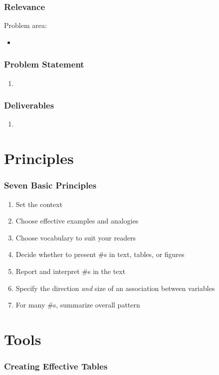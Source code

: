 \documentclass[compress,handout,10pt]{beamer}
\let\olditem\item
\renewcommand{\item}{\setlength{\itemsep}{0.5\baselineskip}\olditem}
\begin{document}
\begin{frame}
    \frametitle{Relevance}
    Problem area:
    \vspace{7pt}
             \begin{itemize}
                 \item 
             \end{itemize}
\end{frame}

\begin{frame}
    \frametitle{Problem Statement}
    \begin{enumerate}
        \item
    \end{enumerate}
\end{frame}

\begin{frame}
    \frametitle{Deliverables}
    \begin{enumerate}
        \item
    \end{enumerate}
\end{frame}

\section{Principles}
\begin{frame}
    \frametitle{Seven Basic Principles}
     \begin{enumerate}
         \item Set the context 
         \item Choose effective examples and analogies
         \item Choose vocabulary to suit your readers
         \item Decide whether to present \#s in text, tables, or figures
         \item Report and interpret \#s in the text
         \item Specify the direction \emph{and} size of an association between variables
         \item For many \#s, summarize overall pattern 
     \end{enumerate}
\end{frame}

\section{Tools}
\begin{frame}
    \frametitle{Creating Effective Tables}
\end{frame}
\end{document}
